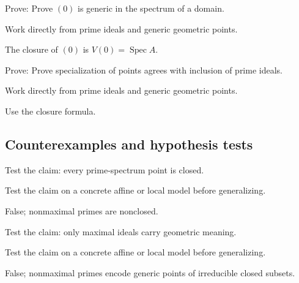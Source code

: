 \begin{exercise}\label{exr:vi06-expand-08}
Prove: Prove $(0)$ is generic in the spectrum of a domain.
\end{exercise}
\begin{hint}
Work directly from prime ideals and generic geometric points.
\end{hint}
\begin{solution}
The closure of $(0)$ is $V(0)=\operatorname{Spec}A$.
\end{solution}

\begin{exercise}\label{exr:vi06-expand-09}
Prove: Prove specialization of points agrees with inclusion of prime ideals.
\end{exercise}
\begin{hint}
Work directly from prime ideals and generic geometric points.
\end{hint}
\begin{solution}
Use the closure formula.
\end{solution}

\subsection*{Counterexamples and hypothesis tests}

\begin{exercise}\label{exr:vi06-expand-10}
Test the claim: every prime-spectrum point is closed.
\end{exercise}
\begin{hint}
Test the claim on a concrete affine or local model before generalizing.
\end{hint}
\begin{solution}
False; nonmaximal primes are nonclosed.
\end{solution}

\begin{exercise}\label{exr:vi06-expand-11}
Test the claim: only maximal ideals carry geometric meaning.
\end{exercise}
\begin{hint}
Test the claim on a concrete affine or local model before generalizing.
\end{hint}
\begin{solution}
False; nonmaximal primes encode generic points of irreducible closed subsets.
\end{solution}

